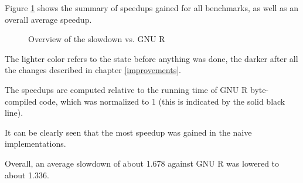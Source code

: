 Figure \ref{fig:overall} shows the summary of speedups gained for all benchmarks, as well as an overall average speedup.

\begin{figure}[htbp]
  \caption{\label{fig:overall}Overview of the slowdown vs. GNU R}
  \centering
\end{figure}

The lighter color refers to the state before anything was done, the darker after all the changes described in chapter \ref{improvements}.

The speedups are computed relative to the running time of GNU R byte-compiled code, which was normalized to 1 (this is indicated by the solid black line).

It can be clearly seen that the most speedup was gained in the naive implementations.

Overall, an average slowdown of about 1.678 against GNU R was lowered to about 1.336.
